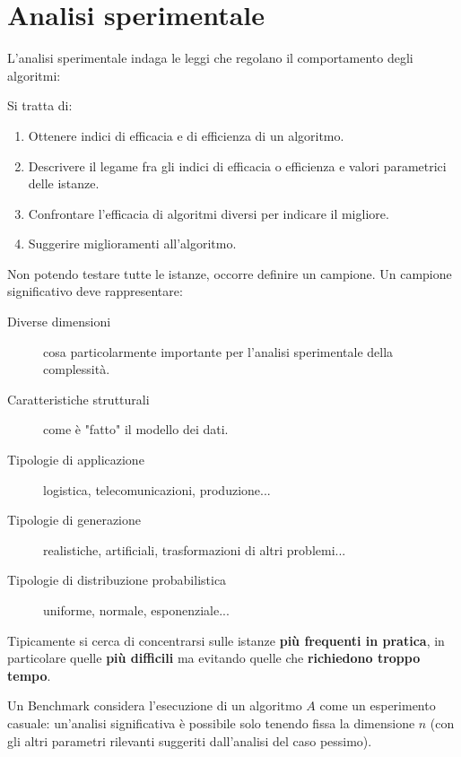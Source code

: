\documentclass[\main/main.tex]{subfiles}
\begin{document}
\chapter{Analisi sperimentale}
\begin{multicols}{2}
\begin{observation}
L'analisi sperimentale indaga le leggi che regolano il comportamento degli algoritmi:

Si tratta di:
\begin{enumerate}
    \item Ottenere indici di efficacia e di efficienza di un algoritmo.
    \item Descrivere il legame fra gli indici di efficacia o efficienza e valori parametrici delle istanze.
    \item Confrontare l'efficacia di algoritmi diversi per indicare il migliore.
    \item Suggerire miglioramenti all'algoritmo.
\end{enumerate}
\end{observation}
\begin{definition}
    Non potendo testare tutte le istanze, occorre definire un campione. Un campione significativo deve rappresentare:
    \begin{description}
        \item[Diverse dimensioni] cosa particolarmente importante per l'analisi sperimentale della complessità.
        \item[Caratteristiche strutturali] come è "fatto" il modello dei dati.
        \item[Tipologie di applicazione] logistica, telecomunicazioni, produzione...
        \item[Tipologie di generazione] realistiche, artificiali, trasformazioni di altri problemi...
        \item[Tipologie di distribuzione probabilistica] uniforme, normale, esponenziale...
    \end{description}
    Tipicamente si cerca di concentrarsi sulle istanze \textbf{più frequenti in pratica}, in particolare quelle \textbf{più difficili} ma evitando quelle che \textbf{richiedono troppo tempo}.
\end{definition}
\begin{definition}[Benchmark]
     Un Benchmark considera l'esecuzione di un algoritmo \(A\) come un esperimento casuale: un'analisi significativa è possibile solo tenendo fissa la dimensione \(n\) (con gli altri parametri rilevanti suggeriti dall'analisi del caso pessimo).

\end{definition}
\end{multicols}
\end{document}
